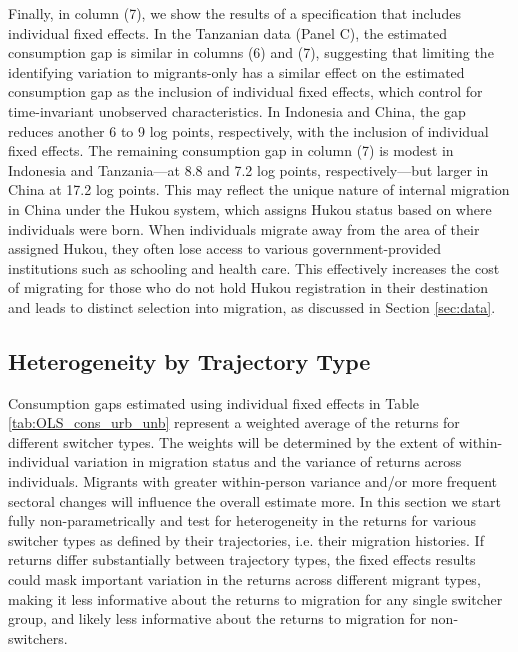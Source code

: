 \documentclass[12pt]{article}
\begin{document}
Finally, in column (7), we show the results of a specification that includes individual fixed effects. 
In the Tanzanian data (Panel C), the estimated consumption gap is similar in columns (6) and (7), suggesting that limiting the identifying variation to migrants-only has a similar effect on the estimated consumption gap as the inclusion of individual fixed effects, which control for time-invariant unobserved characteristics. 
In Indonesia and China, the gap reduces another 6 to 9 log points, respectively, with the inclusion of individual fixed effects. 
The remaining consumption gap in column (7) is modest in Indonesia and Tanzania—at 8.8 and 7.2 log points, respectively—but larger in China at 17.2 log points. This may reflect the unique nature of internal migration in China under the Hukou system, which assigns Hukou status based on where individuals were born. When individuals migrate away from the area of their assigned Hukou, they often lose access to various government-provided institutions such as schooling and health care. This effectively increases the cost of migrating for those who do not hold Hukou registration in their destination and leads to distinct selection into migration, as discussed in Section \ref{sec:data}. 



\begin{landscape}
    
\end{landscape}

\subsection{Heterogeneity by Trajectory Type}\label{sec:heterogeneity}

Consumption gaps estimated using individual fixed effects in Table \ref{tab:OLS_cons_urb_unb} represent a weighted average of the returns for different switcher types. 
The weights will be determined by the extent of within-individual variation in migration status and the variance of returns across individuals.
Migrants with greater within-person variance and/or more frequent sectoral changes will influence the overall estimate more.
In this section we start fully non-parametrically and test for heterogeneity in the returns for various switcher types as defined by their trajectories, i.e. their migration histories. 
If returns differ substantially between trajectory types, the fixed effects results could mask important variation in the returns across different migrant types, making it less informative about the returns to migration for any single switcher group, and likely less informative about the returns to migration for non-switchers.
\end{document}
